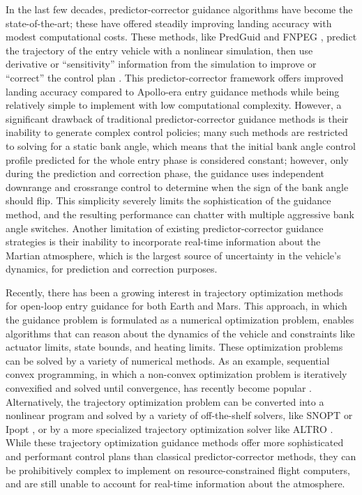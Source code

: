 In the last few decades, predictor-corrector guidance algorithms have become the state-of-the-art; these have offered steadily improving landing accuracy with modest computational costs. These methods, like PredGuid \cite{putnam2010,putnam2014} and FNPEG \cite{lu2014a}, predict the trajectory of the entry vehicle with a nonlinear simulation, then use derivative or ``sensitivity'' information from the simulation to improve or ``correct'' the control plan \cite{lu2008,brunner2008}. This predictor-corrector framework offers improved landing accuracy compared to Apollo-era entry guidance methods \cite{brunner2012a} while being relatively simple to implement with low computational complexity. However, a significant drawback of traditional predictor-corrector guidance methods is their inability to generate complex control policies; many such methods are restricted to solving for a static bank angle, which means that the initial bank angle control profile predicted for the whole entry phase is considered constant; however, only during the prediction and correction phase, the guidance uses independent downrange and crossrange control to determine when the sign of the bank angle should flip. This simplicity severely limits the sophistication of the guidance method, and the resulting performance can chatter with multiple aggressive bank angle switches. Another limitation of existing predictor-corrector guidance strategies is their inability to incorporate real-time information about the Martian atmosphere, which is the largest source of uncertainty in the vehicle's dynamics, for prediction and correction purposes. 

Recently, there has been a growing interest in trajectory optimization methods for open-loop entry guidance for both Earth and Mars. This approach, in which the guidance problem is formulated as a numerical optimization problem, enables algorithms that can reason about the dynamics of the vehicle and constraints like actuator limits, state bounds, and heating limits. These optimization problems can be solved by a variety of numerical methods. As an example, sequential convex programming, in which a non-convex optimization problem is iteratively convexified and solved until convergence, has recently become popular \cite{wang2016,wang2018,mao2019,szmuk2019,szmuk2020,malyuta2021}. Alternatively, the trajectory optimization problem can be converted into a nonlinear program \cite{betts2001} and solved by a variety of off-the-shelf solvers, like SNOPT \cite{gill2005} or Ipopt \cite{wachter2006}, or by a more specialized trajectory optimization solver like ALTRO \cite{howell2019, jackson2021b}. While these trajectory optimization guidance methods offer more sophisticated and performant control plans than classical predictor-corrector methods, they can be prohibitively complex to implement on resource-constrained flight computers, and are still unable to account for real-time information about the atmosphere. 

